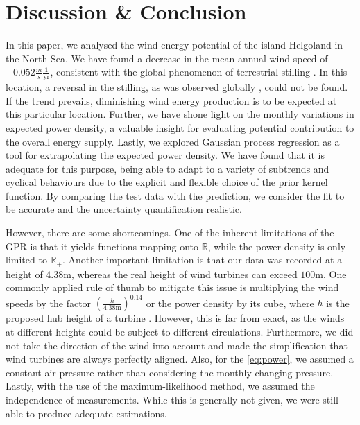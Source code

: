 \documentclass{article}
\theoremstyle{plain}
\theoremstyle{definition}
\theoremstyle{remark}
\newcommand{\R}{\mathbb{R}}
\begin{document}
\section{Discussion \& Conclusion}\label{sec:conclusion}
In this paper, we analysed the wind energy potential of the island Helgoland in the North Sea. 
We have found a decrease in the mean annual wind speed of 
$-0.052 \frac{m}{s}  \frac{1}{\mathrm{yr}}$, 
consistent with the global phenomenon of terrestrial 
stilling \cite{stilling}. In this location, a reversal in the stilling, as  was observed globally \cite{stilling-reversal}, could not be found. If the trend prevails, diminishing wind energy production is to be expected at this particular location.
Further, we have shone light on the monthly variations in expected power density, a valuable insight for evaluating potential contribution to the overall energy supply.
Lastly, we explored Gaussian process regression as a tool for extrapolating the expected power density.
We have found that it is adequate for this purpose, 
being able to adapt to a variety of subtrends and cyclical behaviours due to the explicit and flexible choice of the prior kernel function. By comparing the test data with the prediction, we consider the fit to be accurate and the uncertainty quantification realistic.

However, there are some shortcomings. One of the inherent limitations of the GPR is that it yields functions mapping onto $\R$, while the power density is only limited to $\R_+$. 
Another important limitation is that our data was recorded at a height of $4.38 \mathrm{m}$, whereas the real height of wind turbines can exceed $100 \mathrm{m}$. One commonly applied rule of thumb to mitigate this issue
is multiplying the wind speeds by the factor 
$\left(\frac{h}{4.38 \mathrm{m}} \right)^{0.14}$ or the power density by its cube, 
where $h$ is the  proposed hub height of a turbine \citep{statanalysis}. However, this is far from exact, as the winds at different heights could be subject to different circulations. 
Furthermore, we did not take the direction of the wind into account and made the simplification that wind turbines are always perfectly aligned. 
Also, for the \eqref{eq:power}, we assumed a constant air pressure rather than considering the monthly changing pressure.
Lastly, with the use of the maximum-likelihood method, we assumed the independence of measurements. While this is generally not given, we were still able to produce adequate estimations.
\end{document}

